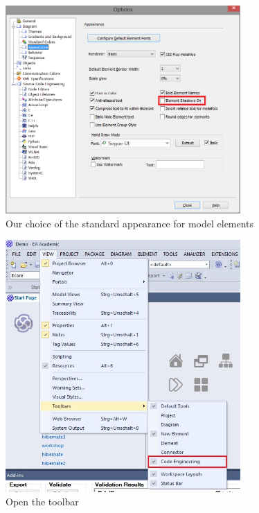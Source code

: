 \begin{figure}[htbp]
  \centering
  \includegraphics[width=0.8\textwidth]{../../org.moflon.doc.handbook.01_installation/4_projectSetup/modelingWithEA/ea_images/standardAppearance}
  \caption{Our choice of the standard appearance for model elements}
  \label{ea:standardAppearanceEA}
\end{figure}

\begin{figure}[htbp]
    \centering
    \includegraphics[width=0.8\textwidth]{../../org.moflon.doc.handbook.01_installation/4_projectSetup/modelingWithEA/ea_images/standardCodeEngineering1}
    \caption{Open the  toolbar}
    \label{ea:standardSCEEA1}
 \end{figure}

